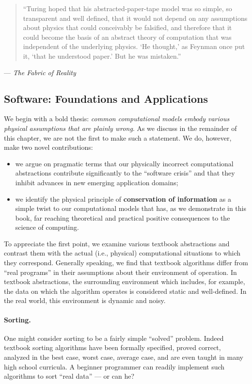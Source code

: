 \documentclass{article}
\begin{document}
\begin{small}
\begin{quote}
``Turing hoped that his abstracted-paper-tape model was so simple, so
  transparent and well defined, that it would not depend on any
  assumptions about physics that could conceivably be falsified, and
  therefore that it could become the basis of an abstract theory of
  computation that was independent of the underlying physics.  `He
  thought,' as Feynman once put it, `that he understood paper.' But he
  was mistaken.''
\end{quote}
\hfill --- \emph{The Fabric of Reality}~\cite{deutsch}
\end{small}

\subsection{Software: Foundations and Applications}

We begin with a bold thesis: \textit{common computational models
  embody various physical assumptions that are plainly
  \emph{wrong}}. As we discuss in the remainder of this chapter, we
are not the first to make such a statement. We do, however, make two
novel contributions:
\begin{itemize}
\item we argue on pragmatic terms that our physically incorrect
  computational abstractions contribute significantly to the
  ``software crisis'' and that they inhibit advances in new emerging
  application domains; 
\item we identify the physical principle of \textbf{conservation of
  information} as a simple twist to our computational models that has,
  as we demonstrate in this book, far reaching theoretical and
  practical positive consequences to the science of computing.
\end{itemize}

To appreciate the first point, we examine various textbook abstractions and
contrast them with the actual (i.e., physical) computational situations to
which they correspond. Generally speaking, we find that textbook algorithms
differ from ``real programs'' in their assumptions about their environment of
operation. In textbook abstractions, the surrounding environment which
includes, for example, the data on which the algorithm operates is considered
static and well-defined. In the real world, this environment is dynamic and
noisy. 

\paragraph*{Sorting.} 
One might consider sorting to be a fairly simple ``solved'' problem. Indeed
textbook sorting algorithms have been formally specified, proved correct,
analyzed in the best case, worst case, average case, and are even taught in
many high school curricula. A beginner programmer can readily implement such
algorithms to sort ``real data'' --- or can he?
\end{document}
